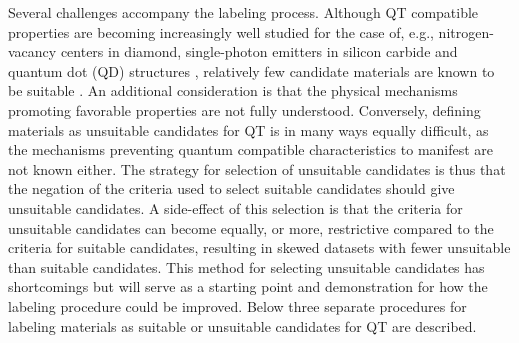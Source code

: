 \documentclass[superscriptaddress,
preprint,
 amsmath,amssymb,
 aps,
]{revtex4-2}
\begin{document}
Several challenges accompany the labeling process. 
Although QT compatible properties are becoming increasingly well studied for the case of, e.g., nitrogen-vacancy centers in diamond, single-photon emitters in silicon carbide and quantum dot (QD) structures \cite{Doherty_2013,Bathen2021,Aharonovich_2016}, relatively few candidate materials are known to be suitable  \cite{Atatuere2018,Zhang2020}. An additional consideration is that the physical mechanisms promoting favorable properties are not fully understood. 
Conversely, defining materials as unsuitable candidates for QT is in many ways equally difficult, as the mechanisms preventing quantum compatible characteristics to manifest are not known either.  
The strategy for selection of unsuitable candidates is thus that the negation of the criteria used to select suitable candidates should give unsuitable candidates.
A side-effect of this selection is that the criteria for unsuitable candidates can become equally, or more, restrictive compared to the criteria for suitable candidates, resulting in skewed datasets with fewer unsuitable than suitable candidates. 
This method for selecting unsuitable candidates has shortcomings but will serve as a starting point and demonstration for how the labeling procedure could be improved. 
Below three separate procedures for labeling materials as suitable or unsuitable candidates for QT are described. 
\end{document}
